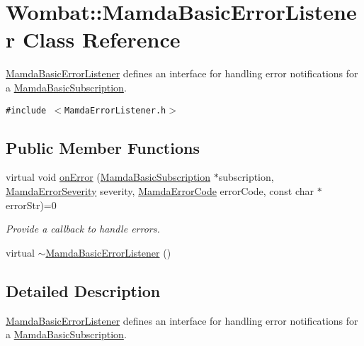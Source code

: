 \hypertarget{classWombat_1_1MamdaBasicErrorListener}{
\section{Wombat::Mamda\-Basic\-Error\-Listener Class Reference}
\label{classWombat_1_1MamdaBasicErrorListener}
}
\hyperlink{classWombat_1_1MamdaBasicErrorListener}{Mamda\-Basic\-Error\-Listener} defines an interface for handling error notifications for a \hyperlink{classWombat_1_1MamdaBasicSubscription}{Mamda\-Basic\-Subscription}.  


{\tt \#include $<$Mamda\-Error\-Listener.h$>$}

\subsection*{Public Member Functions}
\begin{CompactItemize}
\item 
virtual void \hyperlink{classWombat_1_1MamdaBasicErrorListener_26eda50eb507e63df180e73ed3d43014}{on\-Error} (\hyperlink{classWombat_1_1MamdaBasicSubscription}{Mamda\-Basic\-Subscription} $\ast$subscription, \hyperlink{namespaceWombat_10f0aa05514c69e0d8e360af40278c8c}{Mamda\-Error\-Severity} severity, \hyperlink{namespaceWombat_0bef5aac9df8b606704a54a376f45597}{Mamda\-Error\-Code} error\-Code, const char $\ast$error\-Str)=0
\begin{CompactList}\small\item\em Provide a callback to handle errors. \item\end{CompactList}\item 
virtual \hyperlink{classWombat_1_1MamdaBasicErrorListener_0c541cf730dc127a79b5b4062fce7f4a}{$\sim$Mamda\-Basic\-Error\-Listener} ()
\end{CompactItemize}


\subsection{Detailed Description}
\hyperlink{classWombat_1_1MamdaBasicErrorListener}{Mamda\-Basic\-Error\-Listener} defines an interface for handling error notifications for a \hyperlink{classWombat_1_1MamdaBasicSubscription}{Mamda\-Basic\-Subscription}. 



